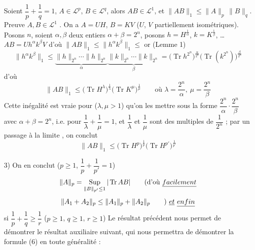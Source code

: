 \documentclass[11pt,a4paper]{article}
\begin{document}
 Soient  $\dfrac1p + \dfrac1q = 1$, $A \in \mathcal{L}^p$, $B \in \mathcal{L}^q$, alors $AB \in \mathcal{L}^1$, et $\|AB\|_1 \leq \|A\|_p\, \|B\|_q$. Preuve    $A, B \in \mathcal{L}^1$ . On a $A = UH$, $B = KV$ ($U$, $V$ partiellement isométriques). Posons \struck{\ill{}} $n$, soient $\alpha, \beta$ deux entiers \ill{}   $\alpha + \beta = 2^n$, posons $h = H^{\frac1\alpha}$, $k = K^{\frac1\beta}$, \ldots $AB = U h^\alpha k^\beta V$ d'où $\|AB\|_1 \leq \|h^\alpha k^\beta\|_1 \leq$ or (Lemme 1) 
\[
  \|h^\alpha k^\beta\|_1 \leq \underbrace{\|h\|_{2^n} \cdots \|h\|_{2^n}}_{\alpha} \underbrace{\|k\|_{2^n} \cdots \|k\|_{2^n}}_{\beta} = \bigl(\operatorname{Tr} h^{2^n}\bigr)^{\frac{\alpha}{2^n}} \bigl(\operatorname{Tr}(k^{2^n})\bigr)^{\frac{\beta}{2^n}}
\]
d'où
\[
  \|AB\|_1 \leq \bigl(\operatorname{Tr} H^{\lambda}\bigr)^{\frac1\lambda} \bigl(\operatorname{Tr} K^{\mu}\bigr)^{\frac1\mu} \qquad \text{où } \lambda = \frac{2^n}{\alpha},\ \mu = \frac{2^n}{\beta}
\]
    Cette inégalité est vraie pour ($\lambda, \mu > 1$)  qu'on  les mettre sous la forme $\dfrac{2^n}{\alpha} \cdot \dfrac{2^n}{\beta}$ avec $\alpha + \beta = 2^n$, i.e. pour  $\dfrac1\lambda + \dfrac1\mu = 1$, \struck{\ill{}} et $\dfrac1\lambda$ et $\dfrac1\mu$ sont des multiples de $\dfrac{1}{2^n}$ ; par un passage à la limite , on conclut
\[
  \|AB\|_1 \leq \bigl(\operatorname{Tr} H^p\bigr)^{\frac1p} \bigl(\operatorname{Tr} H^{p'}\bigr)^{\frac{1}{p'}}
\]
  

3) On en conclut    ($p \geq 1$, $\dfrac1p + \dfrac1{p'} = 1$)
\[
  \|A\|_p = \operatorname*{Sup}_{\|B\|_{p'} \leq 1} |\operatorname{Tr} AB| \qquad (\text{d'où} \ \uncertain{facilement}
\]
\[
  \|A_1 + A_2\|_p \leq \|A_1\|_p + \|A_2\|_p \qquad ) \ \uncertain{et} \ \uncertain{enfin}
\]
 si $\dfrac1p + \dfrac1q \geq \dfrac1r$ \quad ($p \geq 1$, $q \geq 1$, $r \geq 1$)
Le résultat précédent nous permet de démontrer le résultat auxiliaire suivant, qui nous permettra de démontrer la formule (6) en toute généralité :
\end{document}
